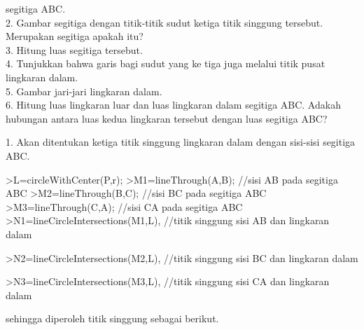 \documentclass[12pt,arial,letterpaper]{book}
\begin{document}
\begin{eulercomment}
\begin{eulercomment}
\begin{eulercomment}
\begin{eulercomment}
\begin{eulercomment}
\begin{eulercomment}
\begin{eulercomment}
\begin{eulercomment}
\begin{eulercomment}
\begin{eulercomment}
\begin{eulercomment}
\begin{eulercomment}
\begin{eulercomment}
\begin{eulercomment}
\begin{eulercomment}
\begin{eulercomment}
\begin{eulercomment}
\begin{eulercomment}
\begin{eulercomment}
\begin{eulercomment}
\begin{eulercomment}
\begin{eulercomment}
\begin{eulercomment}
\begin{eulercomment}
\begin{eulercomment}
segitiga ABC.\\
2. Gambar segitiga dengan titik-titik sudut ketiga titik singgung
tersebut. Merupakan segitiga apakah itu?\\
3. Hitung luas segitiga tersebut.\\
4. Tunjukkan bahwa garis bagi sudut yang ke tiga juga melalui titik
pusat lingkaran dalam.\\
5. Gambar jari-jari lingkaran dalam.\\
6. Hitung luas lingkaran luar dan luas lingkaran dalam segitiga ABC.
Adakah hubungan antara luas kedua lingkaran tersebut dengan luas
segitiga ABC?

\end{eulercomment}
\begin{eulercomment}
1. Akan ditentukan ketiga titik singgung lingkaran dalam dengan
sisi-sisi segitiga ABC.
\end{eulercomment}
\begin{eulerprompt}
>L=circleWithCenter(P,r);
>M1=lineThrough(A,B); //sisi AB pada segitiga ABC
>M2=lineThrough(B,C); //sisi BC pada segitiga ABC
>M3=lineThrough(C,A); //sisi CA pada segitiga ABC
>N1=lineCircleIntersections(M1,L), //titik singgung sisi AB dan lingkaran dalam
\end{eulerprompt}
\begin{euleroutput}
  [0.5,  0.5]
\end{euleroutput}
\begin{eulerprompt}
>N2=lineCircleIntersections(M2,L), //titik singgung sisi BC dan lingkaran dalam
\end{eulerprompt}
\begin{euleroutput}
  [0.632456,  1.31623]
\end{euleroutput}
\begin{eulerprompt}
>N3=lineCircleIntersections(M3,L), //titik singgung sisi CA dan lingkaran dalam
\end{eulerprompt}
\begin{euleroutput}
  [1.31623,  0.632456]
\end{euleroutput}
\begin{eulercomment}
sehingga diperoleh titik singgung sebagai berikut.
\end{eulercomment}
\begin{eulerprompt}

\end{eulerprompt}
\end{eulercomment}
\end{eulercomment}
\end{eulercomment}
\end{eulercomment}
\end{eulercomment}
\end{eulercomment}
\end{eulercomment}
\end{eulercomment}
\end{eulercomment}
\end{eulercomment}
\end{eulercomment}
\end{eulercomment}
\end{eulercomment}
\end{eulercomment}
\end{eulercomment}
\end{eulercomment}
\end{eulercomment}
\end{eulercomment}
\end{eulercomment}
\end{eulercomment}
\end{eulercomment}
\end{eulercomment}
\end{eulercomment}
\end{eulercomment}
\end{document}
